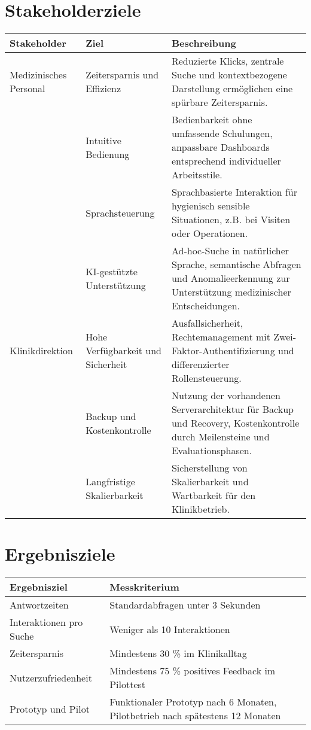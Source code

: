 \section{Stakeholderziele}
\begin{center}
\begin{tabular}{|p{4cm}|p{5cm}|p{6cm}|}
	\hline
	\textbf{Stakeholder} & \textbf{Ziel} & \textbf{Beschreibung} \\
	\hline
	Medizinisches Personal & Zeitersparnis und Effizienz & Reduzierte Klicks, zentrale Suche und kontextbezogene Darstellung ermöglichen eine spürbare Zeitersparnis. \\
	
	& Intuitive Bedienung & Bedienbarkeit ohne umfassende Schulungen, anpassbare Dashboards entsprechend individueller Arbeitsstile. \\
	
	& Sprachsteuerung & Sprachbasierte Interaktion für hygienisch sensible Situationen, z.B. bei Visiten oder Operationen. \\
	
	& KI-gestützte Unterstützung & Ad-hoc-Suche in natürlicher Sprache, semantische Abfragen und Anomalieerkennung zur Unterstützung medizinischer Entscheidungen. \\
	\hline
	Klinikdirektion & Hohe Verfügbarkeit und Sicherheit & Ausfallsicherheit, Rechtemanagement mit Zwei-Faktor-Authentifizierung und differenzierter Rollensteuerung. \\
	
	 & Backup und Kostenkontrolle & Nutzung der vorhandenen Serverarchitektur für Backup und Recovery, Kostenkontrolle durch Meilensteine und Evaluationsphasen. \\
	
	 & Langfristige Skalierbarkeit & Sicherstellung von Skalierbarkeit und Wartbarkeit für den Klinikbetrieb. \\
	\hline
\end{tabular}
\end{center}


\section{Ergebnisziele}
\begin{center}
\begin{tabular}{|p{5cm}|p{10cm}|}
	\hline
	\textbf{Ergebnisziel} & \textbf{Messkriterium} \\
	\hline
	Antwortzeiten & Standardabfragen unter 3 Sekunden \\
	\hline
	Interaktionen pro Suche & Weniger als 10 Interaktionen \\
	\hline
	Zeitersparnis & Mindestens 30 \% im Klinikalltag \\
	\hline
	Nutzerzufriedenheit & Mindestens 75 \% positives Feedback im Pilottest \\
	\hline
	Prototyp und Pilot & Funktionaler Prototyp nach 6 Monaten, Pilotbetrieb nach spätestens 12 Monaten \\
	\hline
\end{tabular}
\end{center}


